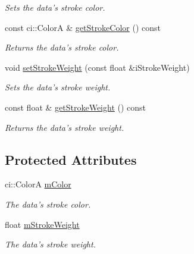 \begin{DoxyCompactItemize}
\begin{DoxyCompactList}\small\item\em Sets the data's stroke color. \end{DoxyCompactList}\item 
\hypertarget{class_plotter_data_af9b81e09f4cb47e0dab3b01f3f1b0e72}{const ci\-::\-Color\-A \& \hyperlink{class_plotter_data_af9b81e09f4cb47e0dab3b01f3f1b0e72}{get\-Stroke\-Color} () const }\label{class_plotter_data_af9b81e09f4cb47e0dab3b01f3f1b0e72}

\begin{DoxyCompactList}\small\item\em Returns the data's stroke color. \end{DoxyCompactList}\item 
\hypertarget{class_plotter_data_a94c7a633258a0ff47d1cf9652cc1c4e1}{void \hyperlink{class_plotter_data_a94c7a633258a0ff47d1cf9652cc1c4e1}{set\-Stroke\-Weight} (const float \&i\-Stroke\-Weight)}\label{class_plotter_data_a94c7a633258a0ff47d1cf9652cc1c4e1}

\begin{DoxyCompactList}\small\item\em Sets the data's stroke weight. \end{DoxyCompactList}\item 
\hypertarget{class_plotter_data_a5c27e760e3df81fdc27386eb3cca804c}{const float \& \hyperlink{class_plotter_data_a5c27e760e3df81fdc27386eb3cca804c}{get\-Stroke\-Weight} () const }\label{class_plotter_data_a5c27e760e3df81fdc27386eb3cca804c}

\begin{DoxyCompactList}\small\item\em Returns the data's stroke weight. \end{DoxyCompactList}\end{DoxyCompactItemize}
\subsection*{Protected Attributes}
\begin{DoxyCompactItemize}
\item 
\hypertarget{class_plotter_data_a27a91db0e47c5beb3e7d63c9fffc33f2}{ci\-::\-Color\-A \hyperlink{class_plotter_data_a27a91db0e47c5beb3e7d63c9fffc33f2}{m\-Color}}\label{class_plotter_data_a27a91db0e47c5beb3e7d63c9fffc33f2}

\begin{DoxyCompactList}\small\item\em The data's stroke color. \end{DoxyCompactList}\item 
\hypertarget{class_plotter_data_adcca0cf31a02559715f6202bc22f4bd3}{float \hyperlink{class_plotter_data_adcca0cf31a02559715f6202bc22f4bd3}{m\-Stroke\-Weight}}\label{class_plotter_data_adcca0cf31a02559715f6202bc22f4bd3}

\begin{DoxyCompactList}\small\item\em The data's stroke weight. \end{DoxyCompactList}\end{DoxyCompactItemize}


